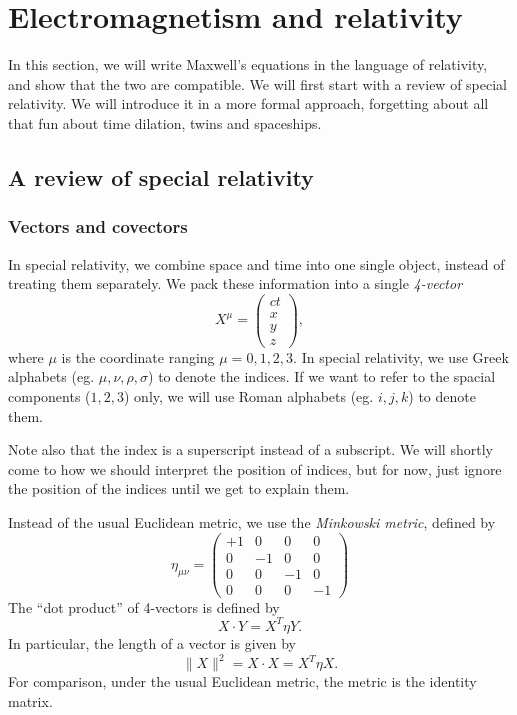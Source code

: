 \documentclass[a4paper]{article}
\begin{document}
\section{Electromagnetism and relativity}
In this section, we will write Maxwell's equations in the language of relativity, and show that the two are compatible. We will first start with a review of special relativity. We will introduce it in a more formal approach, forgetting about all that fun about time dilation, twins and spaceships.

\subsection{A review of special relativity}
\subsubsection{Vectors and covectors}
In special relativity, we combine space and time into one single object, instead of treating them separately. We pack these information into a single \emph{4-vector}
\[
  X^\mu =
  \begin{pmatrix}
    ct\\
    x\\
    y\\
    z
  \end{pmatrix},
\]
where $\mu$ is the coordinate ranging $\mu = 0, 1, 2, 3$. In special relativity, we use Greek alphabets (eg. $\mu, \nu, \rho, \sigma$) to denote the indices. If we want to refer to the spacial components ($1, 2, 3$) only, we will use Roman alphabets (eg. $i, j, k$) to denote them.

Note also that the index is a superscript instead of a subscript. We will shortly come to how we should interpret the position of indices, but for now, just ignore the position of the indices until we get to explain them.

Instead of the usual Euclidean metric, we use the \emph{Minkowski metric}, defined by
\[
  \eta_{\mu\nu} =
  \begin{pmatrix}
    +1 & 0 & 0 & 0\\
    0 & -1 & 0 & 0\\
    0 & 0 & -1 & 0\\
    0 & 0 & 0 & -1
  \end{pmatrix}
\]
The ``dot product'' of 4-vectors is defined by
\[
  X\cdot Y = X^T\eta Y.
\]
In particular, the length of a vector is given by
\[
  \|X\|^2 = X\cdot X = X^T\eta X.
\]
For comparison, under the usual Euclidean metric, the metric is the identity matrix.
\end{document}
